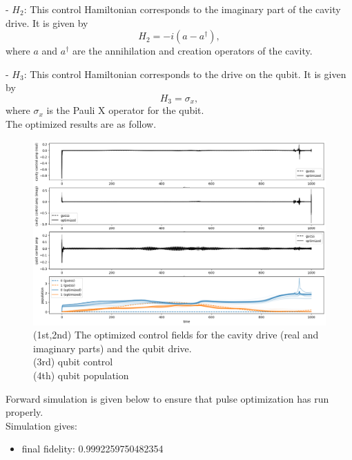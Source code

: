 \documentclass[12pt]{report}
\begin{document}
   - $H_2$: This control Hamiltonian corresponds to the imaginary part of the cavity drive. It is given by
     \begin{equation}
     H_2 = -i\left(a - a^\dagger\right),
     \end{equation}
     where $a$ and $a^\dagger$ are the annihilation and creation operators of the cavity.

   - $H_3$: This control Hamiltonian corresponds to the drive on the qubit. It is given by
     \begin{equation}
     H_3 = \sigma_x,
     \end{equation}
     where $\sigma_x$ is the Pauli X operator for the qubit.
\\
The optimized results are as follow. 
\begin{figure}[H]
    \centering
    \includegraphics[width=0.95\linewidth]{vac2cat_krotov.png}
    \caption{
        (1st,2nd) The optimized control fields for the cavity drive (real and imaginary parts) and the qubit drive. \\
        (3rd) qubit control \\
        (4th) qubit population
    }
    \label{fig:vac2cat_krotov}
\end{figure}

Forward simulation is given below to ensure that pulse optimization has run properly. 
\\
Simulation gives: 
\begin{itemize}
    \item final fidelity:  0.9992259750482354
\end{itemize}
\end{document}
